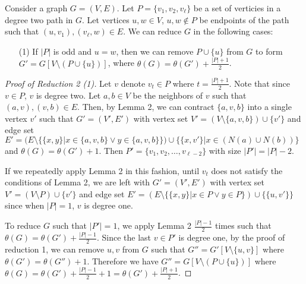 \documentclass[../techreport.tex]{subfiles}
\begin{document}
\begin{reduction}
	Consider a graph $G = (V, E)$. Let $P = \{v_1, v_2, v_{\ell}\}$ be a set of verticies in a degree two path in $G$. Let vertices $u, w \in V$, $u, w \notin P$ be endpoints of the path such that $(u, v_1), (v_{\ell}, w) \in E$. We can reduce $G$ in the following cases:

	\begin{itemize}
		\item[(1)] If $|P|$ is odd and $u = w$, then we can remove $P \cup \{u\}$ from $G$ to form $G' = G[V \setminus (P \cup \{u\})]$, where $\theta(G) = \theta(G') + \frac{|P| + 1}{2}$.
	\end{itemize}

\end{reduction}

\begin{proof}[Proof of Reduction 2 (1)]
	Let $v$ denote $v_t \in P$ where $t = \frac{|P| + 1}{2}$. Note that since $v \in P$, $v$ is degree two. Let $a, b \in V$ be the neighbors of $v$ such that $(a, v), (v, b) \in E$. Then, by Lemma 2, we can contract $\{a, v, b\}$ into a single vertex $v'$ such that $G' = (V', E')$ with vertex set $V' = (V \setminus \{a, v, b\}) \cup \{v'\}$ and edge set $E' = (E \setminus \{\{x, y\}| x \in \{a, v, b\} \lor y \in \{a, v, b\}\}) \cup \{\{x, v'\}| x \in (N(a) \cup N(b))\}$ and $\theta(G) = \theta(G') + 1$. Then $P' = \{v_1, v_2, \dots, v_{\ell - 2}\}$ with size $|P'| = |P| - 2$.

	If we repeatedly apply Lemma 2 in this fashion, until $v_t$ does not satisfy the conditions of Lemma 2, we are left with $G' = (V', E')$ with vertex set $V' = (V \setminus P) \cup \{v'\}$ and edge set $E' = (E \setminus \{\{x, y\}| x \in P \lor y \in P\}) \cup \{\{u, v'\}\}$ since when $|P| = 1$, $v$ is degree one. 

	To reduce $G$ such that $|P'| = 1$, we apply Lemma 2 $\frac{|P| - 1}{2}$ times such that $\theta(G) = \theta(G') + \frac{|P| - 1}{2}$. Since the last $v \in P'$ is degree one, by the proof of reduction 1, we can remove $u, v$ from $G$ such that $G'' = G'[V \setminus \{u, v\}]$ where $\theta(G') = \theta(G'')  + 1$. Therefore we have $G'' = G[V \setminus (P \cup \{u\})]$ where  $\theta(G) = \theta(G') + \frac{|P| - 1}{2} + 1 = \theta(G') + \frac{|P| + 1}{2}$. 
\end{proof}

\end{document}
